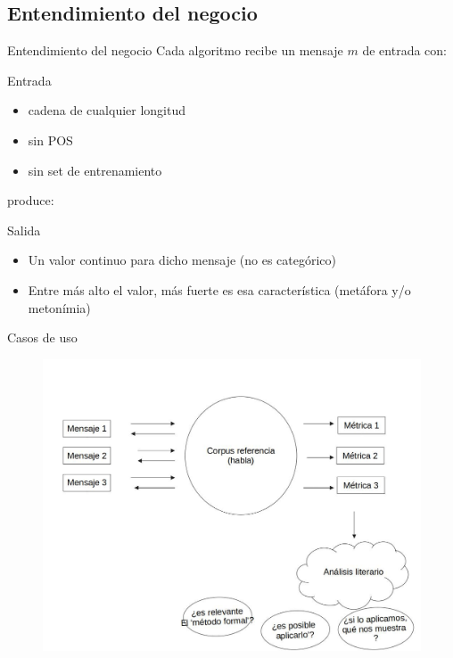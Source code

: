 \documentclass[presentation]{beamer}
\begin{document}
\subsection{Entendimiento del negocio}
\label{sec:org416c6f1}
\begin{frame}[label={sec:org5a4d93c}]{Entendimiento del negocio}
Cada algoritmo recibe un mensaje  \(m\) de entrada con:
\begin{block}{Entrada}
\begin{itemize}
\item cadena de cualquier longitud
\item sin POS
\item sin set de entrenamiento
\end{itemize}
\end{block}
produce:

\begin{block}{Salida}
\begin{itemize}
\item  Un valor continuo para dicho mensaje (no es categórico)
\item  Entre más alto el valor, más fuerte es esa característica (metáfora y/o metonímia)
\end{itemize}
\end{block}
\end{frame}

\begin{frame}[label={sec:org452700b}]{Casos de uso}
  \begin{figure}
   \includegraphics[width=\textwidth]{./assets/posibles_usos.jpg}

\end{figure}
\end{frame}
\end{document}
